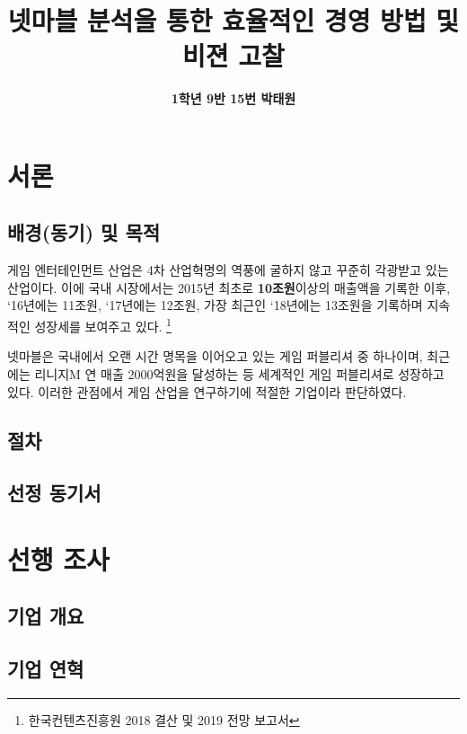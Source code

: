 \documentclass{oblivoir}
\title{\textbf{넷마블 분석을 통한 효율적인 경영 방법 및 비젼 고찰}}
\author{\textbf{1학년 9반 15번 박태원}}
\begin{document}
	\maketitle
	\pagebreak
	
	\begin{center}
	\tableofcontents
	\pagebreak
	\end{center}

	\begin{abstract}
	
	\end{abstract}

	\section{서론}
		\subsection{배경{\small (동기)} 및 목적}
			게임 엔터테인먼트 산업은 4차 산업혁명의 역풍에 굴하지 않고 꾸준히 각광받고 있는 산업이다. 이에 국내 시장에서는 2015년 최초로 \textbf{10조원}이상의 매출액을 기록한 이후, `16년에는 11조원, `17년에는 12조원, 가장 최근인 `18년에는 13조원을 기록하며 지속적인 성장세를 보여주고 있다. 
			\footnote{한국컨텐츠진흥원 2018 결산 및 2019 전망 보고서} 
			
			넷마블은 국내에서 오랜 시간 명목을 이어오고 있는 게임 퍼블리셔 중 하나이며, 최근에는 리니지M 연 매출 2000억원을 달성하는 등 세계적인 게임 퍼블리셔로 성장하고 있다.
			이러한 관점에서 게임 산업을 연구하기에 적절한 기업이라 판단하였다.
			
		\subsection{절차}
			
		\subsection{선정 동기서}
	
	\section{선행 조사}
		\subsection{기업 개요}
		
		\subsection{기업 연혁}
		
\end{document}
